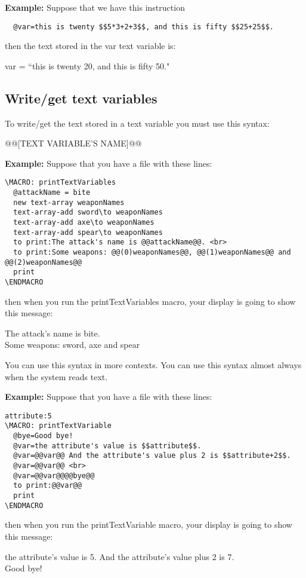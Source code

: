 \documentclass[11pt,a4paper,openright,oneside]{book}
\newenvironment{ex}
{
  \setlength{\parindent}{0cm}
  \large \textbf{Example:} \normalsize 
}
{}
\begin{document}
\begin{ex} Suppose that we have this instruction
  \begin{lstlisting}
  @var=this is twenty $$5*3+2+3$$, and this is fifty $$25+25$$.
  \end{lstlisting}
then the text stored in the \textsf{var} text variable is:
\begin{center} \textsf{var = ``this is twenty 20, and this is fifty 50."} \end{center} 
\end{ex}


\subsection{Write/get text variables}

To write/get the text stored in a text variable you must use this syntax:
\begin{center} \textsf{@@\textsc{\scriptsize[TEXT VARIABLE'S NAME]}@@} \end{center}

\begin{ex} Suppose that you have a file with these lines:
\scriptsize
  \begin{lstlisting}
\MACRO: printTextVariables
  @attackName = bite
  new text-array weaponNames
  text-array-add sword\to weaponNames
  text-array-add axe\to weaponNames
  text-array-add spear\to weaponNames
  to print:The attack's name is @@attackName@@. <br>
  to print:Some weapons: @@(0)weaponNames@@, @@(1)weaponNames@@ and @@(2)weaponNames@@ 
  print
\ENDMACRO
  \end{lstlisting} 
\normalsize
then when you run the \textsf{printTextVariables} macro, your display is going to show this message:
\vspace{5px}

\textsf{The attack's name is bite. \\
Some weapons: sword, axe and spear}

\end{ex}

You can use this syntax in more contexts. You can use this syntax almost always when the system reads text.

\begin{ex} Suppose that you have a file with these lines:
\scriptsize
  \begin{lstlisting}
attribute:5
\MACRO: printTextVariable
  @bye=Good bye!
  @var=the attribute's value is $$attribute$$.
  @var=@@var@@ And the attribute's value plus 2 is $$attribute+2$$.
  @var=@@var@@ <br>
  @var=@@var@@@@bye@@
  to print:@@var@@
  print
\ENDMACRO
  \end{lstlisting} 
\normalsize
then when you run the \textsf{printTextVariable} macro, your display is going to show this message:
\vspace{5px}

\textsf{the attribute's value is 5. And the attribute's value plus 2 is 7. \\
Good bye!}

\end{ex}
\end{document}
